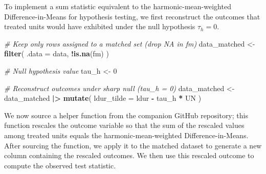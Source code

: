 \documentclass[
  12pt,
  leqno]{article}
\newenvironment{Shaded}{\begin{snugshade}}{\end{snugshade}}
\newcommand{\AttributeTok}[1]{\textcolor[rgb]{0.13,0.29,0.53}{#1}}
\newcommand{\CommentTok}[1]{\textcolor[rgb]{0.56,0.35,0.01}{\textit{#1}}}
\newcommand{\DecValTok}[1]{\textcolor[rgb]{0.00,0.00,0.81}{#1}}
\newcommand{\FunctionTok}[1]{\textcolor[rgb]{0.13,0.29,0.53}{\textbf{#1}}}
\newcommand{\NormalTok}[1]{#1}
\newcommand{\OtherTok}[1]{\textcolor[rgb]{0.56,0.35,0.01}{#1}}
\newcommand{\SpecialCharTok}[1]{\textcolor[rgb]{0.81,0.36,0.00}{\textbf{#1}}}
\begin{document}
To implement a sum statistic equivalent to the harmonic-mean-weighted
Difference-in-Means for hypothesis testing, we first reconstruct the
outcomes that treated units would have exhibited under the null
hypothesis \(\tau_h = 0\).

\singlespacing

\begin{Shaded}
\begin{Highlighting}[]
\CommentTok{\# Keep only rows assigned to a matched set (drop NA in fm)}
\NormalTok{data\_matched }\OtherTok{\textless{}{-}} \FunctionTok{filter}\NormalTok{(}
  \AttributeTok{.data =}\NormalTok{ data, }\SpecialCharTok{!}\FunctionTok{is.na}\NormalTok{(fm)}
\NormalTok{)}

\CommentTok{\# Null hypothesis value}
\NormalTok{tau\_h }\OtherTok{\textless{}{-}} \DecValTok{0}

\CommentTok{\# Reconstruct outcomes under sharp null (tau\_h = 0)}
\NormalTok{data\_matched }\OtherTok{\textless{}{-}}\NormalTok{ data\_matched }\SpecialCharTok{|\textgreater{}}
  \FunctionTok{mutate}\NormalTok{(}
    \AttributeTok{ldur\_tilde =}\NormalTok{ ldur }\SpecialCharTok{{-}}\NormalTok{ tau\_h }\SpecialCharTok{*}\NormalTok{ UN}
\NormalTok{  )}
\end{Highlighting}
\end{Shaded}

\doublespacing

We now source a helper function from the companion GitHub repository;
this function rescales the outcome variable so that the sum of the
rescaled values among treated units equals the harmonic-mean-weighted
Difference-in-Means. After sourcing the function, we apply it to the
matched dataset to generate a new column containing the rescaled
outcomes. We then use this rescaled outcome to compute the observed test
statistic.

\singlespacing
\end{document}
